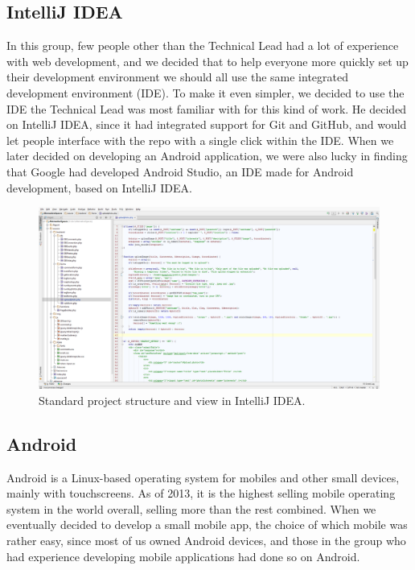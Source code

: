 \subsection{IntelliJ IDEA}
\label{subsec:PlanningSoftwareDevIntelliJ}

In this group, few people other than the Technical Lead had a lot of experience with web development, and we decided that to help everyone more quickly set up their development environment we should all use the same integrated development environment (IDE). To make it even simpler, we decided to use the IDE the Technical Lead was most familiar with for this kind of work. He decided on IntelliJ IDEA, since it had integrated support for Git and GitHub, and would let people interface with the repo with a single click within the IDE. When we later decided on developing an Android application, we were also lucky in finding that Google had developed Android Studio, an IDE made for Android development, based on IntelliJ IDEA.

\begin{figure}[ht!]
  \centering
  \includegraphics[width=\linewidth]{./Planning/img/IntelliJ}
  \caption{Standard project structure and view in IntelliJ IDEA.}
  \label{fig:PlanningSoftwareDevIntelliJView}
\end{figure}

\subsection{Android}
\label{subsec:PlanningSoftwareDevAndroid}

Android is a Linux-based operating system for mobiles and other small devices, mainly with touchscreens. As of 2013, it is the highest selling mobile operating system in the world overall, selling more than the rest combined. When we eventually decided to develop a small mobile app, the choice of which mobile was rather easy, since most of us owned Android devices, and those in the group who had experience developing mobile applications had done so on Android.

